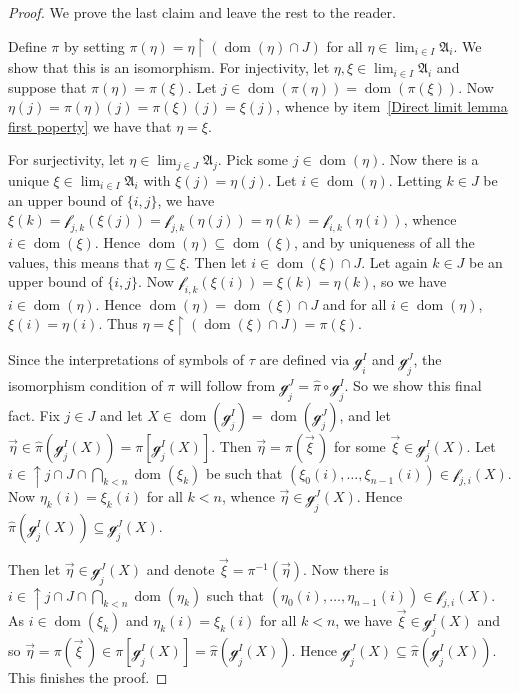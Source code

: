 \documentclass[a4paper]{amsart}
\theoremstyle{definition}
\theoremstyle{remark}
\renewcommand{\restriction}{ {\upharpoonright} }
\newcommand{\A}{\mathcal{A}}
\DeclareMathOperator{\dom}{dom}
\theoremstyle{definition}
\renewcommand{\A}{\mathfrak{A}}
\newcommand{\f}{\mathcal{f}}
\newcommand{\g}{\mathcal{g}}
\DeclareMathOperator{\upset}{\uparrow}
\begin{document}
\begin{proof}
    We prove the last claim and leave the rest to the reader.

    Define $\pi$ by setting $\pi(\eta) = \eta\restriction(\dom(\eta)\cap J)$ for all $\eta\in\lim_{i\in I}\A_i$. We show that this is an isomorphism.
    For injectivity, let $\eta,\xi\in\lim_{i\in I}\A_i$ and suppose that $\pi(\eta) = \pi(\xi)$. Let $j\in\dom(\pi(\eta))=\dom(\pi(\xi))$. Now $\eta(j) = \pi(\eta)(j) = \pi(\xi)(j) = \xi(j)$, whence  by item~\ref{Direct limit lemma first poperty} we have that  $\eta=\xi$.
    
    For surjectivity, let $\eta\in\lim_{j\in J}\A_j$. Pick some $j\in\dom(\eta)$. Now there is a unique $\xi\in\lim_{i\in I}\A_i$ with $\xi(j)=\eta(j)$. Let $i\in\dom(\eta)$. Letting $k\in J$ be an upper bound of $\{i,j\}$, we have $\xi(k) = \f_{j,k}(\xi(j)) = \f_{j,k}(\eta(j)) = \eta(k) = \f_{i,k}(\eta(i))$, whence $i\in\dom(\xi)$. Hence $\dom(\eta)\subseteq\dom(\xi)$, and by uniqueness of all the values, this means that $\eta\subseteq\xi$. Then let $i\in\dom(\xi)\cap J$. Let again $k\in J$ be an upper bound of $\{i,j\}$. Now $\f_{i,k}(\xi(i)) = \xi(k) = \eta(k)$, so we have $i\in\dom(\eta)$. Hence $\dom(\eta) = \dom(\xi)\cap J$ and for all $i\in\dom(\eta)$, $\xi(i) = \eta(i)$. Thus $\eta = \xi\restriction(\dom(\xi)\cap J) = \pi(\xi)$.

    Since the interpretations of symbols of $\tau$ are defined via $\g^I_i$ and $\g^J_j$, the isomorphism condition of $\pi$ will follow from $\g^J_j = \hat\pi\circ\g^I_j$. So we show this final fact. Fix $j\in J$ and let $X\in\dom(\g^I_j) = \dom(\g^J_j)$, and let $\vec\eta\in\hat\pi(\g^I_j(X)) = \pi[\g^I_j(X)]$. Then $\vec\eta = \pi(\vec\xi\,)$ for some $\vec\xi\in\g^I_j(X)$. Let $i\in \upset j\cap J\cap\bigcap_{k<n}\dom(\xi_k)$ be such that $(\xi_0(i),\dots,\xi_{n-1}(i))\in\f_{j,i}(X)$. Now $\eta_k(i)=\xi_k(i)$ for all $k<n$, whence $\vec\eta\in\g^J_j(X)$. Hence $\hat\pi(\g^I_j(X))\subseteq\g^J_j(X)$.

    Then let $\vec\eta\in\g^J_j(X)$ and denote $\vec \xi = \pi^{-1}(\vec\eta)$. Now there is $i\in\upset j\cap J\cap\bigcap_{k<n}\dom(\eta_k)$ such that $(\eta_0(i),\dots,\eta_{n-1}(i))\in\f_{j,i}(X)$. As $i\in\dom(\xi_k)$ and $\eta_k(i) = \xi_k(i)$ for all $k<n$, we have $\vec\xi\in\g^I_j(X)$ and so $\vec\eta=\pi(\vec\xi\,)\in\pi[\g^I_j(X)] = \hat\pi(\g^I_j(X))$. Hence $\g^J_j(X)\subseteq\hat\pi(\g^I_j(X))$. This finishes the proof.
\end{proof}
\end{document}
